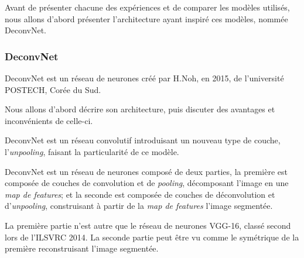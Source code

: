 \documentclass[a4paper, 11pt]{report}
\begin{document}
Avant de présenter chacune des expériences et de comparer les modèles utilisés, nous allons d'abord présenter l'architecture ayant inspiré ces modèles, nommée DeconvNet.

\subsubsection{DeconvNet}

DeconvNet est un réseau de neurones créé par H.Noh, en 2015, de l'université POSTECH, Corée du Sud.

Nous allons d'abord décrire son architecture, puis discuter des avantages et inconvénients de celle-ci.

DeconvNet est un réseau convolutif introduisant un nouveau type de couche, l'\emph{unpooling}, faisant la particularité de ce modèle.

DeconvNet est un réseau de neurones composé de deux parties, la première est composée de couches de convolution et de \emph{pooling}, décomposant l'image en une \emph{map de features}; et la seconde est composée de couches de déconvolution et d'\emph{unpooling}, construisant à partir de la \emph{map de features} l'image segmentée.

La première partie n'est autre que le réseau de neurones VGG-16, classé second lors de l'ILSVRC 2014.
La seconde partie peut être vu comme le symétrique de la première reconstruisant l'image segmentée.
\end{document}
